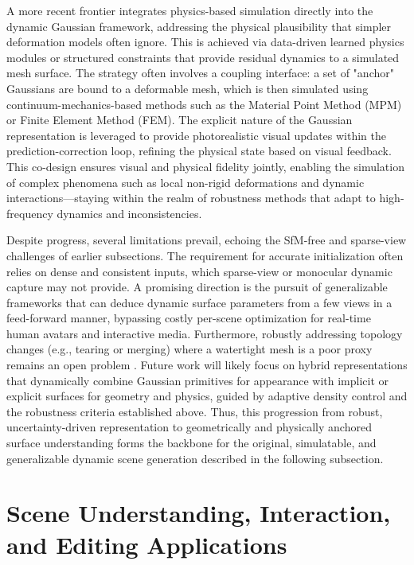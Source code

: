 \documentclass[11pt,a4paper]{article}
\begin{document}
A more recent frontier integrates physics-based simulation directly into the dynamic Gaussian framework, addressing the physical plausibility that simpler deformation models often ignore. This is achieved via data-driven learned physics modules or structured constraints that provide residual dynamics to a simulated mesh surface. The strategy often involves a coupling interface: a set of "anchor" Gaussians are bound to a deformable mesh, which is then simulated using continuum-mechanics-based methods such as the Material Point Method (MPM) or Finite Element Method (FEM). The explicit nature of the Gaussian representation is leveraged to provide photorealistic visual updates within the prediction-correction loop, refining the physical state based on visual feedback. This co-design ensures visual and physical fidelity jointly, enabling the simulation of complex phenomena such as local non-rigid deformations and dynamic interactions---staying within the realm of robustness methods that adapt to high-frequency dynamics and inconsistencies.

Despite progress, several limitations prevail, echoing the SfM-free and sparse-view challenges of earlier subsections. The requirement for accurate initialization often relies on dense and consistent inputs, which sparse-view or monocular dynamic capture may not provide. A promising direction is the pursuit of generalizable frameworks that can deduce dynamic surface parameters from a few views in a feed-forward manner, bypassing costly per-scene optimization for real-time human avatars and interactive media. Furthermore, robustly addressing topology changes (e.g., tearing or merging) where a watertight mesh is a poor proxy remains an open problem \cite{arxiv:1404.0554v1,arxiv:2506.02751v3}. Future work will likely focus on hybrid representations that dynamically combine Gaussian primitives for appearance with implicit or explicit surfaces for geometry and physics, guided by adaptive density control and the robustness criteria established above. Thus, this progression from robust, uncertainty-driven representation to geometrically and physically anchored surface understanding forms the backbone for the original, simulatable, and generalizable dynamic scene generation described in the following subsection.


\section{Scene Understanding, Interaction, and Editing Applications}
\end{document}
